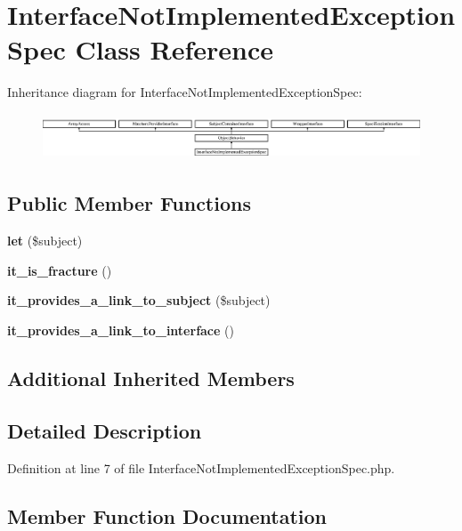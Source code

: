 \section{Interface\+Not\+Implemented\+Exception\+Spec Class Reference}
\label{classspec_1_1_php_spec_1_1_exception_1_1_fracture_1_1_interface_not_implemented_exception_spec}
Inheritance diagram for Interface\+Not\+Implemented\+Exception\+Spec\+:\begin{figure}[H]
\begin{center}
\leavevmode
\includegraphics[height=1.388430cm]{classspec_1_1_php_spec_1_1_exception_1_1_fracture_1_1_interface_not_implemented_exception_spec}
\end{center}
\end{figure}
\subsection*{Public Member Functions}
\begin{DoxyCompactItemize}
\item 
{\bf let} (\$subject)
\item 
{\bf it\+\_\+is\+\_\+fracture} ()
\item 
{\bf it\+\_\+provides\+\_\+a\+\_\+link\+\_\+to\+\_\+subject} (\$subject)
\item 
{\bf it\+\_\+provides\+\_\+a\+\_\+link\+\_\+to\+\_\+interface} ()
\end{DoxyCompactItemize}
\subsection*{Additional Inherited Members}


\subsection{Detailed Description}


Definition at line 7 of file Interface\+Not\+Implemented\+Exception\+Spec.\+php.



\subsection{Member Function Documentation}
